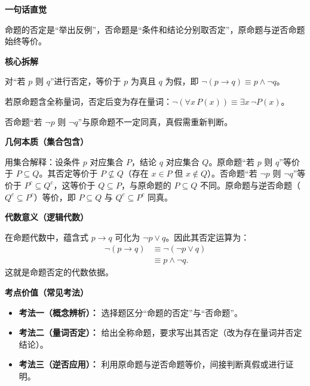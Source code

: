 \begin{explanationbox}

	\textbf{\textcolor{CExplanation}{一句话直觉}}

	命题的否定是“举出反例”，否命题是“条件和结论分别取否定”，原命题与逆否命题始终等价。

	\medskip
	\textbf{\textcolor{CExplanation}{核心拆解}}
	\begin{description}[style=nextline, leftmargin=2.8em, labelsep=0.5em, itemsep=0.45em]
		\item[\textbf{要点一（否定本质）：}] 对“若 $p$ 则 $q$”进行否定，等价于 $p$ 为真且 $q$ 为假，即 $\lnot(p\to q) \equiv p\land\lnot q$。
		\item[\textbf{要点二（量词转换）：}] 若原命题含全称量词，否定后变为存在量词：$\lnot(\forall x\,P(x))\equiv\exists x\,\lnot P(x)$。
		\item[\textbf{要点三（否命题特性）：}] 否命题“若 $\lnot p$ 则 $\lnot q$”与原命题不一定同真，真假需重新判断。
	\end{description}

	\medskip
	\textbf{\textcolor{CExplanation}{几何本质（集合包含）}}

	用集合解释：设条件 $p$ 对应集合 $P$，结论 $q$ 对应集合 $Q$。原命题“若 $p$ 则 $q$”等价于 $P\subseteq Q$。其否定等价于 $P\nsubseteq Q$（存在 $x\in P$ 但 $x\notin Q$）。否命题“若 $\lnot p$ 则 $\lnot q$”等价于 $P^c\subseteq Q^c$，这等价于 $Q\subseteq P$，与原命题的 $P\subseteq Q$ 不同。原命题与逆否命题（$Q^c\subseteq P^c$）等价，即 $P\subseteq Q$ 与 $Q^c\subseteq P^c$ 同真。

	\medskip
	\textbf{\textcolor{CExplanation}{代数意义（逻辑代数）}}

	在命题代数中，蕴含式 $p\to q$ 可化为 $\lnot p\lor q$。因此其否定运算为：
	\[
		\begin{aligned}
			\lnot(p\to q) &\equiv \lnot(\lnot p\lor q) \\
			&\equiv p\land\lnot q.
		\end{aligned}
	\]
	这就是命题否定的代数依据。

	\medskip
	\textbf{\textcolor{CExplanation}{考点价值（常见考法）}}
	\begin{itemize}[leftmargin=*, itemsep=0.5em, topsep=0.4em]
		\item \textbf{考法一（概念辨析）：} 选择题区分“命题的否定”与“否命题”。
		\item \textbf{考法二（量词否定）：} 给出全称命题，要求写出其否定（改为存在量词并否定结论）。
		\item \textbf{考法三（逆否应用）：} 利用原命题与逆否命题等价，间接判断真假或进行证明。
	\end{itemize}


\end{explanationbox}
